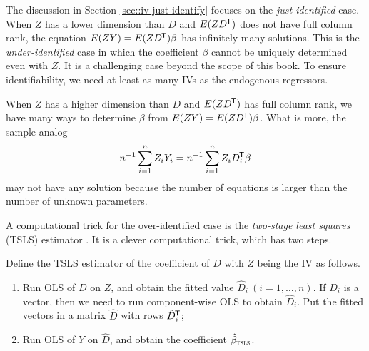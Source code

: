The discussion in Section \ref{sec::iv-just-identify} focuses on the {\it just-identified} case.  When $Z$ has a lower dimension than $D$ and $E(ZD^{\mkern-1.5mu\mathsf{T}})$ does not have full column rank, the equation $E(  ZY)  = E(ZD^{\mkern-1.5mu\mathsf{T}}) \beta$ has infinitely many solutions. This is the {\it under-identified} case in which the coefficient $\beta$ cannot be uniquely determined even with $Z$. It is a challenging case beyond the scope of this book. To ensure identifiability, we need at least as many IVs as the endogenous regressors. 

When $Z$ has a higher dimension than $D$ and $E(ZD^{\mkern-1.5mu\mathsf{T}})$ has full column rank, we have many ways to determine $\beta$ from $E(  ZY)  = E(ZD^{\mkern-1.5mu\mathsf{T}}) \beta$. What is more,  the sample analog 
$$
n^{-1} \sum_{i=1}^n Z_iY_i = n^{-1} \sum_{i=1}^n Z_i D_i^{\mkern-1.5mu\mathsf{T}} \beta
$$
may not have any solution because the number of equations is larger than the number of unknown parameters. 


A computational trick for the over-identified case is the {\it two-stage least squares}  (TSLS) estimator \citep{theil1953estimation, basmann1957generalized}. It is a clever computational trick, which has two steps.

\begin{definition}
\label{def::2sls}
Define the TSLS estimator of the coefficient of $D$ with $Z$ being the IV as follows. 
\begin{enumerate}
\item
Run OLS of $D$ on $Z$, and obtain the fitted value $\hat{D}_i\ (i=1,\ldots, n)$. If $D_i$ is a vector, then we need to run component-wise OLS to obtain $\hat{D}_i$. Put the fitted vectors in a matrix $\hat{D}$ with rows $\hat{D}_i^{\mkern-1.5mu\mathsf{T}} $;
\item
Run OLS of $Y$ on $\hat{D}$, and obtain the coefficient $\hat{\beta}_\textsc{tsls}$.  
\end{enumerate}
\end{definition}
 

